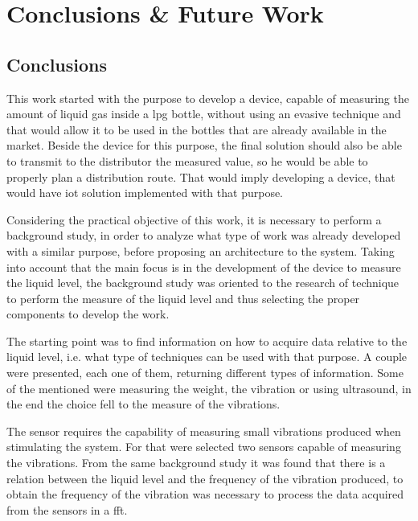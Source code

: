 \cleardoublepage
\chapter{Conclusions \& Future Work}\label{chap:finalremarks}

\section{Conclusions}
This work started with the purpose to develop a device, capable of measuring the amount of liquid gas inside a \acrshort{lpg} bottle, without using an evasive technique and that would allow it to be used in the bottles that  are already available in the market. Beside the device for this purpose, the final solution should also be able to transmit to the distributor the measured value, so he would be able to properly plan a distribution route. That would imply developing a device, that would have \acrshort{iot} solution implemented with that purpose. 

Considering the practical objective of this work, it is necessary to perform a background study, in order to analyze what type of work was already developed with a similar purpose, before proposing an architecture to the system. Taking into account that the main focus is in the development of the device to measure the liquid level, the background study was oriented to the research of technique to perform the measure of the liquid level and thus selecting the proper components to develop the work.

The starting point was to find information on how to acquire data relative to the liquid level, i.e. what type of techniques can be used with that purpose. A couple were presented, each one of them, returning different types of information. Some of the mentioned were measuring the weight, the vibration or using ultrasound, in the end the choice fell to the measure of the vibrations. 

The sensor requires the capability of measuring small vibrations produced when stimulating the system. For that were selected two sensors capable of measuring the vibrations. From the same background study it was found that there is a relation between the liquid level and the frequency of the vibration produced, to obtain the frequency of the vibration was necessary to process the data acquired from the sensors in a \acrshort{fft}.

